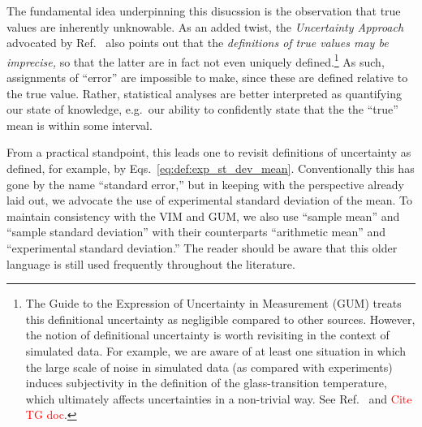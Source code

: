 The fundamental idea underpinning this disucssion is the observation that true values are inherently unknowable.  As an added twist, the {\it Uncertainty Approach} advocated by Ref.~\cite{JCGM:GUM2008} also points out that the {\it definitions of true values may be imprecise,} so that the latter are in fact not even uniquely defined.\footnote{The Guide to the Expression of Uncertainty in Measurement (GUM) treats this definitional uncertainty as negligible compared to other sources.  However, the notion of definitional uncertainty is worth revisiting in the context of simulated data.  For example, we are aware of at least one situation in which the large scale of noise in simulated data (as compared with experiments) induces subjectivity in the definition of the glass-transition temperature, which ultimately affects uncertainties in a non-trivial way.  See Ref.~\cite{Patrone1} and \textcolor{red}{Cite TG doc}.} As such, assignments of ``error'' are impossible to make, since these are defined relative to the true value.  Rather, statistical analyses are better interpreted as quantifying our state of knowledge, e.g.\ our ability to confidently state that the the ``true'' mean is within some interval.  

From a practical standpoint, this leads one to revisit definitions of uncertainty as defined, for example, by Eqs.~\eqref{eq:def:exp_st_dev_mean}.  Conventionally this has gone by the name ``standard error,'' but in keeping with the perspective already laid out, we advocate the use of experimental standard deviation of the mean.  To maintain consistency with the VIM and GUM, we also use ``sample mean'' and ``sample standard deviation'' with their counterparts ``arithmetic mean'' and ``experimental standard deviation.''  The reader should be aware that this older language is still used frequently throughout the literature.




